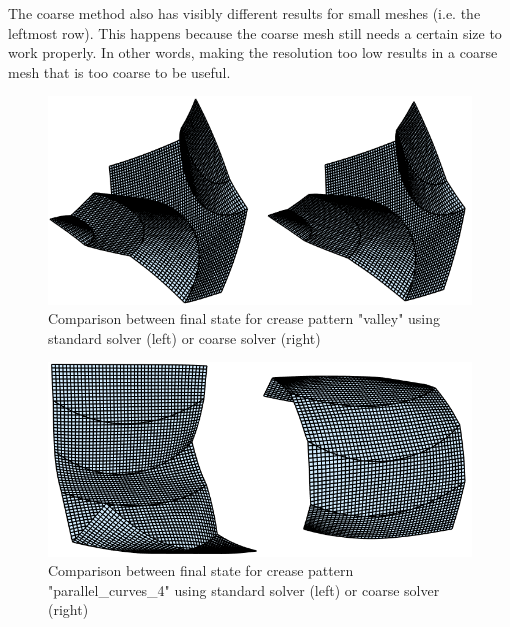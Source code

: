\documentclass[a4paper,twoside,12pt,nochapterprefix]{scrbook}
\begin{document}
The coarse method also has visibly different results for small meshes (i.e. the leftmost row). This happens because the coarse mesh still needs a certain size to work properly. In other words, making the resolution too low results in a coarse mesh that is too coarse to be useful.\newline
\begin{figure}
    \centering
    \includegraphics[width=0.8\linewidth]{figures/0303_standard_vs_coarse_valley}
    \caption{Comparison between final state for crease pattern "valley" using standard solver (left) or coarse solver (right)}
      \label{fig:results_compare_valley}
\end{figure}
\begin{figure}
    \centering
    \includegraphics[width=0.8\linewidth]{figures/0303_standard_vs_coarse_parallel_curves_4}
    \caption{Comparison between final state for crease pattern "parallel\_curves\_4" using standard solver (left) or coarse solver (right)}
      \label{fig:results_compare_curves}
\end{figure}
\end{document}
